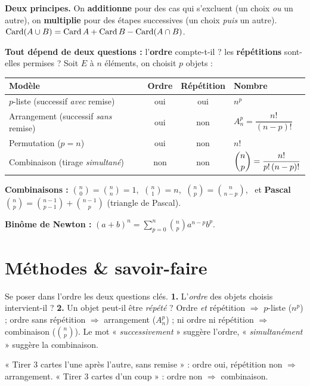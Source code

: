 \begin{synthese}
\textbf{Deux principes.} On \textbf{additionne} pour des cas qui s'excluent (un choix
\emph{ou} un autre), on \textbf{multiplie} pour des étapes successives (un choix
\emph{puis} un autre). \quad $\operatorname{Card}(A\cup B)=\operatorname{Card} A+\operatorname{Card} B-\operatorname{Card}(A\cap B)$.

\smallskip
\textbf{Tout dépend de deux questions :} l'\textbf{ordre} compte-t-il ? les
\textbf{répétitions} sont-elles permises ? Soit $E$ à $n$ éléments, on choisit $p$
objets :
\begin{center}\renewcommand{\arraystretch}{1.4}
\color{white}
\begin{tabular}{@{}l c c l@{}}
\toprule
\textbf{Modèle} & \textbf{Ordre} & \textbf{Répétition} & \textbf{Nombre} \\
\midrule
$p$-liste (successif \emph{avec} remise)      & oui & oui & $n^p$ \\
Arrangement (successif \emph{sans} remise)    & oui & non & $A_n^p=\dfrac{n!}{(n-p)!}$ \\
Permutation ($p=n$)                           & oui & non & $n!$ \\
Combinaison (tirage \emph{simultané})         & non & non & $\dbinom{n}{p}=\dfrac{n!}{p!\,(n-p)!}$ \\
\bottomrule
\end{tabular}
\end{center}

\smallskip
\textbf{Combinaisons :} $\binom{n}{0}=\binom{n}{n}=1$, $\ \binom{n}{1}=n$,
$\ \binom{n}{p}=\binom{n}{n-p}$, \ et \textbf{Pascal}
$\binom{n}{p}=\binom{n-1}{p-1}+\binom{n-1}{p}$ (triangle de Pascal).

\smallskip
\textbf{Binôme de Newton :} $\displaystyle (a+b)^n=\sum_{p=0}^{n}\binom{n}{p}a^{n-p}b^{p}$.
\end{synthese}

\section{Méthodes \& savoir-faire}

Se poser dans l'ordre les deux questions clés. \textbf{1.} L'\emph{ordre} des objets
choisis intervient-il ? \textbf{2.} Un objet peut-il être \emph{répété} ? Ordre
\emph{et} répétition $\Rightarrow$ $p$-liste ($n^p$) ; ordre sans répétition
$\Rightarrow$ arrangement ($A_n^p$) ; ni ordre ni répétition $\Rightarrow$
combinaison ($\binom{n}{p}$). Le mot « \emph{successivement} » suggère l'ordre,
« \emph{simultanément} » suggère la combinaison.
\begin{exemple}
« Tirer $3$ cartes l'une après l'autre, sans remise » : ordre oui, répétition non
$\Rightarrow$ arrangement. « Tirer $3$ cartes d'un coup » : ordre non $\Rightarrow$
combinaison.
\end{exemple}

